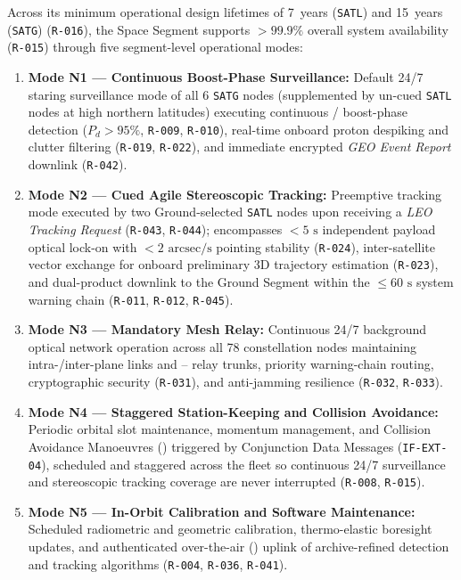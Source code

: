 Across its minimum operational design lifetimes of 7~years (\texttt{SATL}) and 15~years (\texttt{SATG}) (\texttt{R-016}), the Space Segment supports $> 99.9\%$ overall system availability (\texttt{R-015}) through five segment-level operational modes:
\begin{enumerate}
    \item \textbf{Mode N1 --- Continuous Boost-Phase Surveillance:} Default 24/7 staring surveillance mode of all 6 \texttt{SATG} nodes (supplemented by un-cued \texttt{SATL} nodes at high northern latitudes) executing continuous / boost-phase detection ($P_d > 95\%$, \texttt{R-009}, \texttt{R-010}), real-time onboard proton despiking and clutter filtering (\texttt{R-019}, \texttt{R-022}), and immediate encrypted \emph{GEO Event Report} downlink (\texttt{R-042}).
    \item \textbf{Mode N2 --- Cued Agile Stereoscopic Tracking:} Preemptive tracking mode executed by two Ground-selected \texttt{SATL} nodes upon receiving a \emph{LEO Tracking Request} (\texttt{R-043}, \texttt{R-044}); encompasses $< 5\text{ s}$ independent payload optical  lock-on with $< 2\text{ arcsec/s}$ pointing stability (\texttt{R-024}), inter-satellite   vector exchange for onboard preliminary 3D trajectory estimation (\texttt{R-023}), and dual-product downlink to the Ground Segment within the $\le 60\text{ s}$ system warning chain (\texttt{R-011}, \texttt{R-012}, \texttt{R-045}).
    \item \textbf{Mode N3 --- Mandatory  Mesh Relay:} Continuous 24/7 background optical network operation across all 78 constellation nodes maintaining intra-/inter-plane  links and -- relay trunks, priority warning-chain routing, cryptographic security (\texttt{R-031}), and anti-jamming resilience (\texttt{R-032}, \texttt{R-033}).
    \item \textbf{Mode N4 --- Staggered Station-Keeping and Collision Avoidance:} Periodic orbital slot maintenance, momentum management, and Collision Avoidance Manoeuvres () triggered by Conjunction Data Messages (\texttt{IF-EXT-04}), scheduled and staggered across the fleet so continuous 24/7 surveillance and stereoscopic tracking coverage are never interrupted (\texttt{R-008}, \texttt{R-015}).
    \item \textbf{Mode N5 --- In-Orbit Calibration and  Software Maintenance:} Scheduled radiometric and geometric calibration, thermo-elastic boresight updates, and authenticated over-the-air () uplink of archive-refined detection and tracking algorithms (\texttt{R-004}, \texttt{R-036}, \texttt{R-041}).
\end{enumerate}

